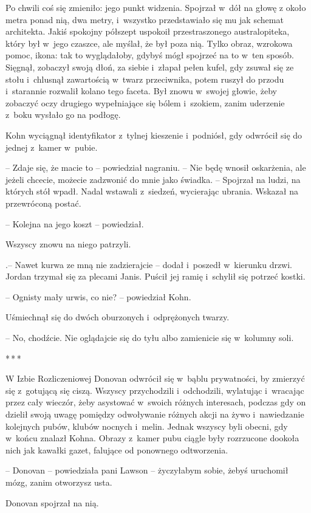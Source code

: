 \documentclass[oneside,polish,11pt,sfheadings]{mwbk}
\newcommand{\threeast}{\bigskip\par\centerline{*\,*\,*}\medskip\par}%
\begin{document}
Po chwili coś się zmieniło: jego punkt widzenia. Spojrzał w~dół na głowę
z około metra ponad nią, dwa metry, i~wszystko przedstawiało się mu jak
schemat architekta. Jakiś spokojny półszept uspokoił przestraszonego
australopiteka, który był w~jego czaszce, ale myślał, że był poza nią.
Tylko obraz, wzrokowa pomoc, ikona: tak to wyglądałoby, gdybyś mógł
spojrzeć na to w~ten sposób. Sięgnął, zobaczył swoją dłoń, za siebie i~złapał pełen kufel, gdy zsuwał się ze stołu i~chlusnął zawartością w~twarz przeciwnika, potem ruszył do przodu i~starannie rozwalił kolano
tego faceta. Był znowu w~swojej głowie, żeby zobaczyć oczy drugiego
wypełniające się bólem i~szokiem, zanim uderzenie z~boku wysłało go na
podłogę.

Kohn wyciągnął identyfikator z~tylnej kieszenie i~podniósł, gdy odwrócił
się do jednej z~kamer w~pubie.

-- Zdaje się, że macie to -- powiedział nagraniu. -- Nie będę wnosił
oskarżenia, ale jeżeli chcecie, możecie zadzwonić do mnie jako świadka.
-- Spojrzał na ludzi, na których stół wpadł. Nadal wstawali z~siedzeń,
wycierając ubrania. Wskazał na przewróconą postać.

-- Kolejna na jego koszt -- powiedział.

Wszyscy znowu na niego patrzyli.

.-- Nawet kurwa ze mną nie zadzierajcie -- dodał i~poszedł w~kierunku
drzwi. Jordan trzymał się za plecami Janis. Puścił jej ramię i~schylił
się potrzeć kostki.

-- Ognisty mały urwis, co nie? -- powiedział Kohn.

Uśmiechnął się do dwóch oburzonych i~odprężonych twarzy.

-- No, chodźcie. Nie oglądajcie się do tyłu albo zamienicie się w~kolumny
soli.
  \threeast 

W Izbie Rozliczeniowej Donovan odwrócił się w~bąblu prywatności, by
zmierzyć się z~gotującą się ciszą. Wszyscy przychodzili i~odchodzili,
wylatując i~wracając przez cały wieczór, żeby asystować w~swoich różnych
interesach, podczas gdy on dzielił swoją uwagę pomiędzy odwoływanie
różnych akcji na żywo i~nawiedzanie kolejnych pubów, klubów nocnych i~melin. Jednak wszyscy byli obecni, gdy w~końcu znalazł Kohna. Obrazy z~kamer pubu ciągle były rozrzucone dookoła nich jak kawałki gazet,
falujące od ponownego odtworzenia.

-- Donovan -- powiedziała pani Lawson -- życzyłabym sobie, żebyś uruchomił
mózg, zanim otworzysz usta.

Donovan spojrzał na nią. 
\end{document}
